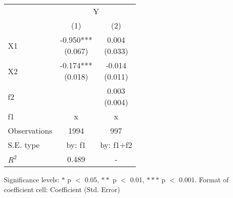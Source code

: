 \renewcommand\cellalign{t}
\begin{threeparttable}
\begin{tabular}{lcc}
\toprule
 & \multicolumn{2}{c}{Y} \\
\cmidrule(lr){2-3} 
 & (1) & (2) \\
\midrule
X1 & \makecell{-0.950*** \\ (0.067)} & \makecell{0.004 \\ (0.033)} \\
X2 & \makecell{-0.174*** \\ (0.018)} & \makecell{-0.014 \\ (0.011)} \\
f2 &  & \makecell{0.003 \\ (0.004)} \\
\midrule
f1 & x & x \\
\midrule
Observations & 1994 & 997 \\
S.E. type & by: f1 & by: f1+f2 \\
$R^2$ & 0.489 & - \\
\bottomrule
\end{tabular}
\footnotesize Significance levels: $*$ p $<$ 0.05, $**$ p $<$ 0.01, $***$ p $<$ 0.001. Format of coefficient cell: Coefficient 
 (Std. Error)
\end{threeparttable}